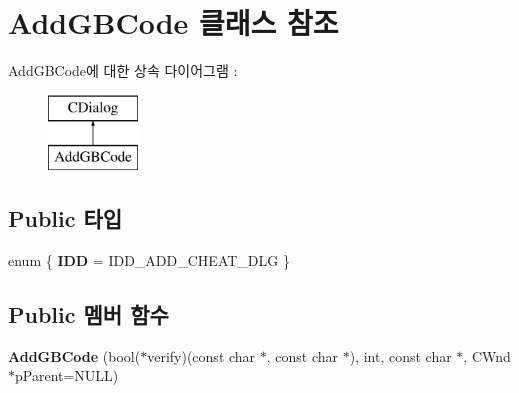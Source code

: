 \hypertarget{class_add_g_b_code}{}\section{Add\+G\+B\+Code 클래스 참조}
\label{class_add_g_b_code}
Add\+G\+B\+Code에 대한 상속 다이어그램 \+: \begin{figure}[H]
\begin{center}
\leavevmode
\includegraphics[height=2.000000cm]{class_add_g_b_code}
\end{center}
\end{figure}
\subsection*{Public 타입}
\begin{DoxyCompactItemize}
\item 
\mbox{\label{class_add_g_b_code_a2dd2d84fa89620e9d1bd9816ac698df9}} 
enum \{ {\bfseries I\+DD} = I\+D\+D\+\_\+\+A\+D\+D\+\_\+\+C\+H\+E\+A\+T\+\_\+\+D\+LG
 \}
\end{DoxyCompactItemize}
\subsection*{Public 멤버 함수}
\begin{DoxyCompactItemize}
\item 
\mbox{\label{class_add_g_b_code_a99be74c9c22f954a6a83fb1e8eba7b29}} 
{\bfseries Add\+G\+B\+Code} (bool($\ast$verify)(const char $\ast$, const char $\ast$), int, const char $\ast$, C\+Wnd $\ast$p\+Parent=N\+U\+LL)
\end{DoxyCompactItemize}
